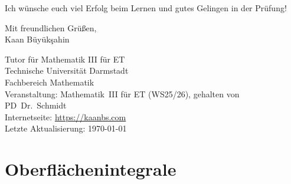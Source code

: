 \documentclass[a4paper,11pt,oneside,open=any,parskip=half, DIV=15]{scrreprt}
\begin{document}
   \vspace{1em}
   Ich wünsche euch viel Erfolg beim Lernen und gutes Gelingen in der Prüfung!

   \vspace{0.5em}
   Mit freundlichen Grüßen,\\
   Kaan Büyükşahin

   \vspace{1em}
   Tutor für Mathematik III für ET\\
   Technische Universität Darmstadt\\
   Fachbereich Mathematik\\
   Veranstaltung: Mathematik~III für ET (WS25/26), gehalten von PD~Dr.\ Schmidt\\
   Internetseite: \url{https://kaanbs.com}\\
   Letzte Aktualisierung: \today

\tableofcontents
\cleardoublepage{}


\chapter{Oberflächenintegrale}
\end{document}
